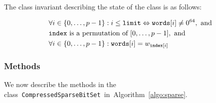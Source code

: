 \documentclass[a4paper,11pt]{article}
\theoremstyle{definition}
\newcommand{\Algoref}[1]{Algorithm~\ref{#1}}
\newcommand{\Words}{\texttt{words}}
\newcommand{\Index}{\texttt{index}}
\newcommand{\Limit}{\texttt{limit}}
\newcommand{\SparseBitSet}{\texttt{CompressedSparseBitSet}}
\numberwithin{equation}{section}
\begin{document}
\noindent
The class invariant describing the state of the class is as follows:

\begin{alignat}{1}
  \label{eq:invariant}
  &\forall i \in \Set{0,\dots,p-1}: i \leq \Limit \Leftrightarrow \Words[i] \neq 0^{64}, \text{~and} \\
  &\Index~\text{is a permutation of~} [0,\dots,p-1],\text{~and} \\
  &\forall i \in \Set{0,\dots,p-1}: \Words[i] = w_{\Index[i]}
\end{alignat}


\subsubsection{Methods}
We now describe the methods in the class~\SparseBitSet~in~\Algoref{algo:sparse}.
\end{document}
